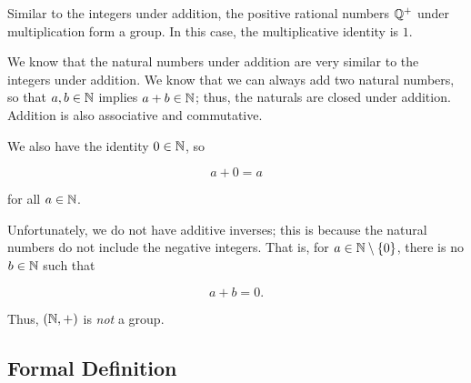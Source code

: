 \begin{example}
Similar to the integers under addition, the positive rational
numbers $\mathbb{Q}^{+}$ under multiplication form a \gls{group}.
In this case, the multiplicative identity is $1$.
\end{example}

\begin{example}
We know that the natural numbers under addition are
very similar to the integers under addition.
We know that we can always add two natural numbers,
so that $a,b\in\mathbb{N}$ implies $a+b\in\mathbb{N}$;
thus, the naturals are closed under addition.
Addition is also \gls{associative} and \gls{commutative}.

We also have the identity $0\in\mathbb{N}$, so

\begin{equation}
    a + 0 = a
\end{equation}

\noindent
for all $a\in\mathbb{N}$.

Unfortunately, we do not have additive inverses;
this is because the natural numbers do not include the negative integers.
That is, for $a\in\mathbb{N}\setminus\left\{ 0 \right\}$, there is no $b\in\mathbb{N}$ such that

\begin{equation}
    a + b = 0.
\end{equation}

\noindent
Thus, $\left( \mathbb{N},+ \right)$ is \emph{not} a \gls{group}.
\end{example}

\subsection{Formal Definition}

